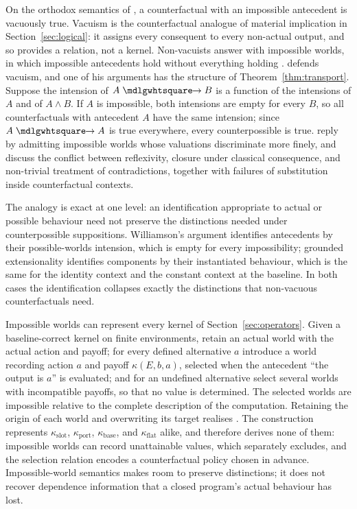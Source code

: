 On the orthodox semantics of \textcite{lewis1973counterfactuals}, a counterfactual with an impossible
antecedent is vacuously true. Vacuism is the counterfactual analogue of material implication in
Section~\ref{sec:logical}: it assigns every consequent to every non-actual output, and so provides a
relation, not a kernel. Non-vacuists answer with impossible worlds, in which impossible antecedents
hold without everything holding \autocite{nolan1997,brogaardsalerno2013}. \textcite{williamson2015,williamson2018}
defends vacuism, and one of his arguments has the structure of Theorem~\ref{thm:transport}. Suppose the
intension of $A\mathrel{\Prov\!\!\to}B$ is a function of the intensions of $A$ and of $A\wedge B$. If $A$ is
impossible, both intensions are empty for every $B$, so all counterfactuals with antecedent $A$ have the
same intension; since $A\mathrel{\Prov\!\!\to}A$ is true everywhere, every counterpossible is true.
\textcite{bertoetal2018} reply by admitting impossible worlds whose valuations discriminate more finely,
and discuss the conflict between reflexivity, closure under classical consequence, and non-trivial
treatment of contradictions, together with failures of substitution inside counterfactual contexts.

The analogy is exact at one level: an identification appropriate to actual or possible behaviour need
not preserve the distinctions needed under counterpossible suppositions. Williamson's argument
identifies antecedents by their possible-worlds intension, which is empty for every impossibility;
grounded extensionality identifies components by their instantiated behaviour, which is the same for
the identity context and the constant context at the baseline. In both cases the identification
collapses exactly the distinctions that non-vacuous counterfactuals need.

Impossible worlds can represent every kernel of Section~\ref{sec:operators}. Given a baseline-correct
kernel on finite environments, retain an actual world with the actual action and payoff; for every
defined alternative $a$ introduce a world recording action $a$ and payoff $\kappa(E,b,a)$, selected when
the antecedent \enquote{the output is $a$} is evaluated; and for an undefined alternative select several
worlds with incompatible payoffs, so that no value is determined. The selected worlds are impossible
relative to the complete description of the computation. Retaining the origin of each world and
overwriting its target realises . The construction represents $\kappa_{\mathrm{slot}}$,
$\kappa_{\mathrm{port}}$, $\kappa_{\mathrm{base}}$, and $\kappa_{\mathrm{flat}}$ alike, and therefore
derives none of them: impossible worlds can record unattainable values, which  separately
excludes, and the selection relation encodes a counterfactual policy chosen in advance. Impossible-world
semantics makes room to preserve distinctions; it does not recover dependence information that a
closed program's actual behaviour has lost.

